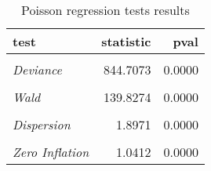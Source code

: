 \begin{table}[ht]

\caption{\label{tab:poisson_reg_tests}Poisson regression tests results}
\centering
\begin{tabular}[t]{>{}lrr}
\toprule
test & statistic & pval\\
\midrule
\em{\cellcolor{gray!6}{Pearson}} & \cellcolor{gray!6}{2279.8732} & \cellcolor{gray!6}{0.0000}\\
\em{Deviance} & 844.7073 & 0.0000\\
\em{\cellcolor{gray!6}{LR}} & \cellcolor{gray!6}{118.0931} & \cellcolor{gray!6}{0.0000}\\
\em{Wald} & 139.8274 & 0.0000\\
\em{\cellcolor{gray!6}{Bootstrap Outliers}} & \cellcolor{gray!6}{0.0031} & \cellcolor{gray!6}{0.0200}\\
\addlinespace
\em{Dispersion} & 1.8971 & 0.0000\\
\em{\cellcolor{gray!6}{K-S Uniformity}} & \cellcolor{gray!6}{0.0185} & \cellcolor{gray!6}{0.7623}\\
\em{Zero Inflation} & 1.0412 & 0.0000\\
\bottomrule
\end{tabular}
\end{table}
